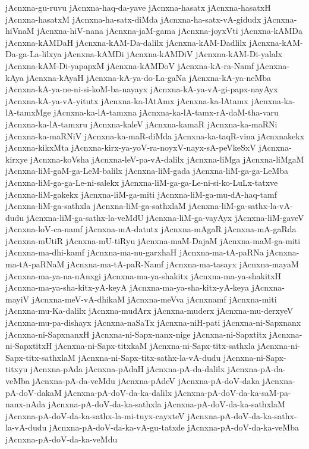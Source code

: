 {jAcnxna-gu-ruvu
jAcnxna-haq-da-yave
jAcnxna-hasatx
jAcnxna-hasatxH
jAcnxna-hasatxM
jAcnxna-ha-satx-diMda
jAcnxna-ha-satx-vA-gidudx
jAcnxna-hiVnaM
jAcnxna-hiV-nana
jAcnxna-jaM-gama
jAcnxna-joyxVti
jAcnxna-kAMDa
jAcnxna-kAMDaH
jAcnxna-kAM-Da-dalilx
jAcnxna-kAM-Dadlilx
jAcnxna-kAM-Da-ga-La-lilxya
jAcnxna-kAMDi
jAcnxna-kAMDiV
jAcnxna-kAM-Di-yalalx
jAcnxna-kAM-Di-yapapxM
jAcnxna-kAMDoV
jAcnxna-kA-ra-Namf
jAcnxna-kAya
jAcnxna-kAyaH
jAcnxna-kA-ya-do-La-gaNa
jAcnxna-kA-ya-neMba
jAcnxna-kA-ya-ne-ni-si-koM-ba-nayayx
jAcnxna-kA-ya-vA-gi-papx-nayAyx
jAcnxna-kA-ya-vA-yitutx
jAcnxna-ka-lAtAmx
jAcnxna-ka-lAtamx
jAcnxna-ka-lA-tamxMge
jAcnxna-ka-lA-tamxna
jAcnxna-ka-lA-tamx-rA-daM-tha-varu
jAcnxna-ka-lA-tamxru
jAcnxna-kaleV
jAcnxna-kamaR
jAcnxna-ka-maRNi
jAcnxna-ka-maRNiV
jAcnxna-ka-maR-diMda
jAcnxna-ka-taqR-vina
jAcnxnakekx
jAcnxna-kikxMta
jAcnxna-kirx-ya-yoV-ra-noyxV-nayx-sA-peVkeSxV
jAcnxna-kirxye
jAcnxna-koVsha
jAcnxna-leV-pa-vA-dalilx
jAcnxna-liMga
jAcnxna-liMgaM
jAcnxna-liM-gaM-ga-LeM-balilx
jAcnxna-liM-gada
jAcnxna-liM-ga-ga-LeMba
jAcnxna-liM-ga-ga-Le-ni-salekx
jAcnxna-liM-ga-ga-Le-ni-si-ko-LuLx-tatxve
jAcnxna-liM-gakekx
jAcnxna-liM-ga-miti
jAcnxna-liM-ga-mu-dA-haq-tamf
jAcnxna-liM-ga-sathxla
jAcnxna-liM-ga-sathxlaM
jAcnxna-liM-ga-sathx-la-vA-dudu
jAcnxna-liM-ga-sathx-la-veMdU
jAcnxna-liM-ga-vayAyx
jAcnxna-liM-gaveV
jAcnxna-loV-ca-namf
jAcnxna-mA-datutx
jAcnxna-mAgaR
jAcnxna-mA-gaRda
jAcnxna-mUtiR
jAcnxna-mU-tiRyu
jAcnxna-maM-DajaM
jAcnxna-maM-ga-miti
jAcnxna-ma-dhi-kamf
jAcnxna-ma-nu-garxhaH
jAcnxna-ma-tA-paRNa
jAcnxna-ma-tA-paRNaM
jAcnxna-ma-tA-paR-Namf
jAcnxna-ma-tasayx
jAcnxna-mayaM
jAcnxna-ma-ya-na-nAnxgi
jAcnxna-ma-ya-shakitx
jAcnxna-ma-ya-shakitxH
jAcnxna-ma-ya-sha-kitx-yA-keyA
jAcnxna-ma-ya-sha-kitx-yA-keya
jAcnxna-mayiV
jAcnxna-meV-vA-dhikaM
jAcnxna-meVva
jAcnxnamf
jAcnxna-miti
jAcnxna-mu-Ka-dalilx
jAcnxna-mudArx
jAcnxna-muderx
jAcnxna-mu-derxyeV
jAcnxna-mu-pa-dishayx
jAcnxna-naSaTx
jAcnxna-niH-pati
jAcnxna-ni-Sapxnanx
jAcnxna-ni-SapxnanxH
jAcnxna-ni-Sapx-nanx-nige
jAcnxna-ni-Sapxtitx
jAcnxna-ni-SapxtitxH
jAcnxna-ni-Sapx-titxkaM
jAcnxna-ni-Sapx-titx-sathxla
jAcnxna-ni-Sapx-titx-sathxlaM
jAcnxna-ni-Sapx-titx-sathx-la-vA-dudu
jAcnxna-ni-Sapx-titxyu
jAcnxna-pAda
jAcnxna-pAdaH
jAcnxna-pA-da-dalilx
jAcnxna-pA-da-veMba
jAcnxna-pA-da-veMdu
jAcnxna-pAdeV
jAcnxna-pA-doV-daka
jAcnxna-pA-doV-dakaM
jAcnxna-pA-doV-da-ka-dalilx
jAcnxna-pA-doV-da-ka-saM-pa-nanx-nAda
jAcnxna-pA-doV-da-ka-sathxla
jAcnxna-pA-doV-da-ka-sathxlaM
jAcnxna-pA-doV-da-ka-sathx-la-mi-tuyx-cayxteV
jAcnxna-pA-doV-da-ka-sathx-la-vA-dudu
jAcnxna-pA-doV-da-ka-vA-gu-tatxde
jAcnxna-pA-doV-da-ka-veMba
jAcnxna-pA-doV-da-ka-veMdu
}
